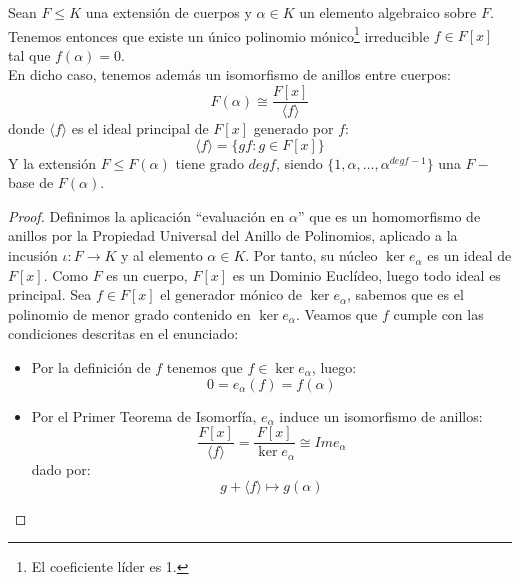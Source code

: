 \begin{prop}\label{prop:pol_irreducible}
    Sean $F\leq K$ una extensión de cuerpos y $\alpha\in K$ un elemento algebraico sobre $F$. Tenemos entonces que existe un único polinomio mónico\footnote{El coeficiente líder es 1.} irreducible $f\in F[x]$ tal que $f(\alpha)=0$.\\

    \noindent
    En dicho caso, tenemos además un isomorfismo de anillos entre cuerpos:
    \begin{equation*}
        F(\alpha) \cong \frac{F[x]}{\langle f \rangle }
    \end{equation*}
    donde $\langle f \rangle $ es el ideal principal de $F[x]$ generado por $f$:
    \begin{equation*}
        \langle f \rangle  = \{gf : g\in F[x]\}
    \end{equation*}
    Y la extensión $F\leq F(\alpha)$ tiene grado $deg f$, siendo $\{1,\alpha,\ldots,\alpha^{degf - 1}\}$ una $F-$base de $F(\alpha)$.
    \begin{proof} 
        Definimos la aplicación ``evaluación en $\alpha$''
        que es un homomorfismo de anillos por la Propiedad Universal del Anillo de Polinomios, aplicado a la incusión $\iota:F\to K$ y al elemento $\alpha\in K$. Por tanto, su núcleo $\ker e_\alpha$ es un ideal de $F[x]$. Como $F$ es un cuerpo, $F[x]$ es un Dominio Euclídeo, luego todo ideal es principal. Sea $f\in F[x]$ el generador mónico de $\ker e_{\alpha}$, sabemos que es el polinomio de menor grado contenido en $\ker e_{\alpha}$. Veamos que $f$ cumple con las condiciones descritas en el enunciado:
        \begin{itemize}
            \item Por la definición de $f$ tenemos que $f\in \ker e_\alpha$, luego:
                \begin{equation*}
                    0 = e_\alpha(f) = f(\alpha)
                \end{equation*}
            \item Por el Primer Teorema de Isomorfía, $e_{\alpha}$ induce un isomorfismo de anillos:
                \begin{equation*}
                    \frac{F[x]}{\langle f \rangle } = \frac{F[x]}{\ker e_\alpha} \cong Im e_{\alpha}
                \end{equation*}
                dado por:
                \begin{equation*}
                    g+\langle f \rangle  \longmapsto g(\alpha)

\end{equation*}
\end{itemize}
\end{proof}
\end{prop}
